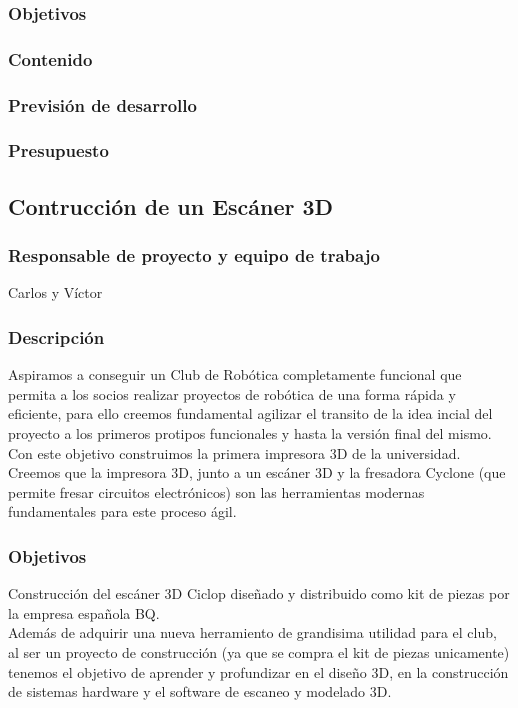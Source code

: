\documentclass[12pt,twoside]{report}
\begin{document}
\subsubsection{Objetivos}
\subsubsection{Contenido}
\subsubsection{Previsión de desarrollo}
\subsubsection{Presupuesto}


\subsection{Contrucción de un Escáner 3D}
\subsubsection{Responsable de proyecto y equipo de trabajo}
Carlos y Víctor
\subsubsection{Descripción}
Aspiramos a conseguir un Club de Robótica completamente funcional que permita a los socios realizar proyectos de robótica de una forma rápida y eficiente, para ello creemos fundamental agilizar el transito de la idea incial del proyecto a los primeros protipos funcionales y hasta la versión final del mismo. \\
Con este objetivo construimos la primera impresora 3D de la universidad. Creemos que la impresora 3D, junto a un escáner 3D y la fresadora Cyclone (que permite fresar circuitos electrónicos) son las herramientas modernas fundamentales para este proceso ágil.

\subsubsection{Objetivos}
Construcción del escáner 3D Ciclop diseñado y distribuido como kit de piezas por la empresa española BQ.\\
Además de adquirir una nueva herramiento de grandisima utilidad para el club, al ser un proyecto de construcción (ya que se compra el kit de piezas unicamente) tenemos el objetivo de aprender y profundizar en el diseño 3D, en la construcción de sistemas hardware y el software de escaneo y modelado 3D.
\end{document}

